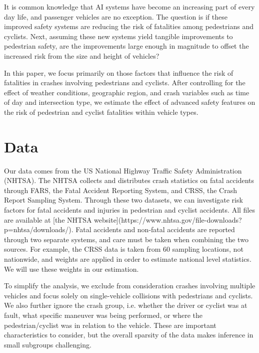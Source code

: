 \documentclass[12pt]{article}
\begin{document}
It is common knowledge that AI systems have become an increasing part of every day life, and passenger
vehicles are no exception. The question is if these improved safety systems are reducing the risk of fatalities
among pedestrians and cyclists. Next, assuming these new systems yield tangible improvements to pedestrian safety,
are the improvements large enough in magnitude to offset the increased risk from the size and height of vehicles?

In this paper, we focus primarily on those factors that influence the risk of fatalities in crashes involving pedestrians
and cyclists. After controlling for the effect of weather conditions,
geographic region, and crash variables such as time of day and intersection type, we estimate the effect
of advanced safety features on the risk of pedestrian and cyclist fatalities within vehicle types.


\section{Data}

Our data comes from the US National Highway Traffic Safety Administration (NHTSA). The NHTSA collects and distributes
crash statistics on fatal accidents through FARS, the Fatal Accident Reporting System, and CRSS, the Crash Report
Sampling System. Through these two datasets, we can investigate risk factors for fatal accidents and injuries in
pedestrian and cyclist accidents. All files are available at
    [the NHTSA website](https://www.nhtsa.gov/file-downloads?p=nhtsa/downloads/).  Fatal accidents and non-fatal 
accidents are reported through two separate systems, and care must be taken when combining the two sources. For example,
the CRSS data is taken from 60 sampling locations, not nationwide, and weights are applied in order to estimate 
national level statistics\cite{national_highway_traffic_safety_administration_crash_nodate}. We will use these weights
in our estimation. 

To simplify the analysis, we exclude from consideration crashes involving multiple vehicles and focus solely 
on single-vehicle collisions with pedestrians and cyclists. We also further ignore the crash group, i.e. 
whether the driver or cyclist was at fault, what specific maneuver was being performed, or where the pedestrian/cyclist
was in relation to the vehicle. These are important characteristics to consider, but the overall sparsity of the data 
makes inference in small subgroups challenging.
\end{document}
